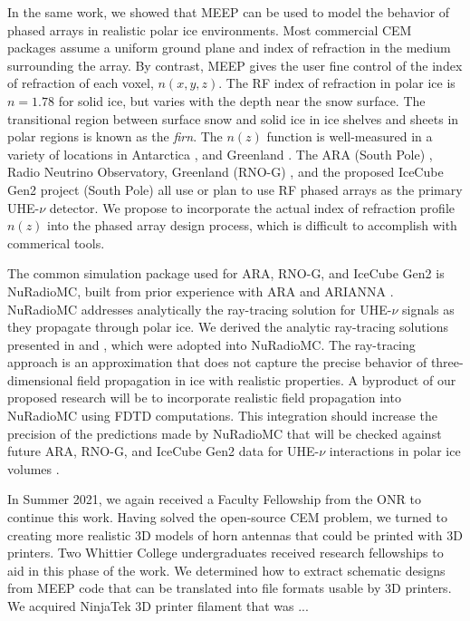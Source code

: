 \documentclass[../../main.tex]{subfiles}
\begin{document}
In the same work, we showed that MEEP can be used to model the behavior of phased arrays in realistic polar ice environments.  Most commercial CEM packages assume a uniform ground plane and index of refraction in the medium surrounding the array.  By contrast, MEEP gives the user fine control of the index of refraction of each voxel, $n(x,y,z)$.  The RF index of refraction in polar ice is $n = 1.78$ for solid ice, but varies with the depth near the snow surface.  The transitional region between surface snow and solid ice in ice shelves and sheets in polar regions is known as the \textit{firn}.  The $n(z)$ function is well-measured in a variety of locations in Antarctica \cite{horizPaper}, and Greenland \cite{deaconu_2018}.  The ARA (South Pole) \cite{PhysRevD.105.122006}, Radio Neutrino Observatory, Greenland (RNO-G) \cite{rno}, and the proposed IceCube Gen2 project (South Pole) \cite{Aartsen_2021} all use or plan to use RF phased arrays as the primary UHE-$\nu$ detector.  We propose to incorporate the actual index of refraction profile $n(z)$ into the phased array design process, which is difficult to accomplish with commerical tools. \\ \vspace{2.5mm}

The common simulation package used for ARA, RNO-G, and IceCube Gen2 is NuRadioMC, built from prior experience with ARA and ARIANNA \cite{10.1140/epjc/s10052-020-7612-8,10.1109/tns.2015.2468182,10.1016/j.astropartphys.2011.11.010,Barwick:2014pca,10.1103/physrevd.102.043021}.  NuRadioMC addresses analytically the ray-tracing solution for UHE-$\nu$ signals as they propagate through polar ice.  We derived the analytic ray-tracing solutions presented in \cite{horizPaper} and \cite{10.1140/epjc/s10052-020-7612-8}, which were adopted into NuRadioMC.  The ray-tracing approach is an approximation that does not capture the precise behavior of three-dimensional field propagation in ice with realistic properties.  A byproduct of our proposed research will be to incorporate realistic field propagation into NuRadioMC using FDTD computations.  This integration should increase the precision of the predictions made by NuRadioMC that will be checked against future ARA, RNO-G, and IceCube Gen2 data for UHE-$\nu$ interactions in polar ice volumes \cite{10.22323/1.395.1217}. \\ \vspace{2.5mm}

In Summer 2021, we again received a Faculty Fellowship from the ONR to continue this work.  Having solved the open-source CEM problem, we turned to creating more realistic 3D models of horn antennas that could be printed with 3D printers.  Two Whittier College undergraduates received research fellowships to aid in this phase of the work.  We determined how to extract schematic designs from MEEP code that can be translated into file formats usable by 3D printers.  We acquired NinjaTek 3D printer filament that was ...
\end{document}
